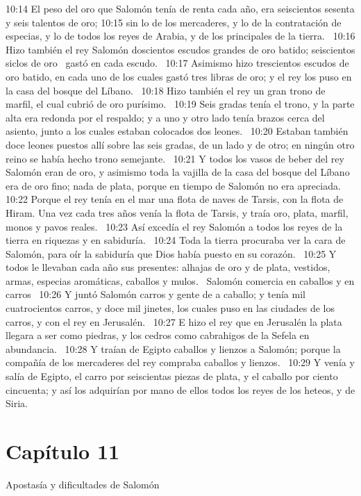 10:14 El peso del oro que Salomón tenía de renta cada año, era seiscientos sesenta y seis talentos de oro; 
10:15 sin lo de los mercaderes, y lo de la contratación de especias, y lo de todos los reyes de Arabia, y de los principales de la tierra.  
10:16 Hizo también el rey Salomón doscientos escudos grandes de oro batido; seiscientos siclos de oro  gastó en cada escudo.  
10:17 Asimismo hizo trescientos escudos de oro batido, en cada uno de los cuales gastó tres libras de oro; y el rey los puso en la casa del bosque del Líbano.  
10:18 Hizo también el rey un gran trono de marfil, el cual cubrió de oro purísimo.  
10:19 Seis gradas tenía el trono, y la parte alta era redonda por el respaldo; y a uno y otro lado tenía brazos cerca del asiento, junto a los cuales estaban colocados dos leones.  
10:20 Estaban también doce leones puestos allí sobre las seis gradas, de un lado y de otro; en ningún otro reino se había hecho trono semejante.  
10:21 Y todos los vasos de beber del rey Salomón eran de oro, y asimismo toda la vajilla de la casa del bosque del Líbano era de oro fino; nada de plata, porque en tiempo de Salomón no era apreciada.  
10:22 Porque el rey tenía en el mar una flota de naves de Tarsis, con la flota de Hiram. Una vez cada tres años venía la flota de Tarsis, y traía oro, plata, marfil, monos y pavos reales.  
10:23 Así excedía el rey Salomón a todos los reyes de la tierra en riquezas y en sabiduría.  
10:24 Toda la tierra procuraba ver la cara de Salomón, para oír la sabiduría que Dios había puesto en su corazón.  
10:25 Y todos le llevaban cada año sus presentes: alhajas de oro y de plata, vestidos, armas, especias aromáticas, caballos y mulos.  
Salomón comercia en caballos y en carros  
10:26 Y juntó Salomón carros y gente de a caballo; y tenía mil cuatrocientos carros, y doce mil jinetes, los cuales puso en las ciudades de los carros, y con el rey en Jerusalén.  
10:27 E hizo el rey que en Jerusalén la plata llegara a ser como piedras, y los cedros como cabrahigos de la Sefela en abundancia.  
10:28 Y traían de Egipto caballos y lienzos a Salomón; porque la compañía de los mercaderes del rey compraba caballos y lienzos.  
10:29 Y venía y salía de Egipto, el carro por seiscientas piezas de plata, y el caballo por ciento cincuenta; y así los adquirían por mano de ellos todos los reyes de los heteos, y de Siria.  
\section*{Capítulo 11 }
Apostasía y dificultades de Salomón  

